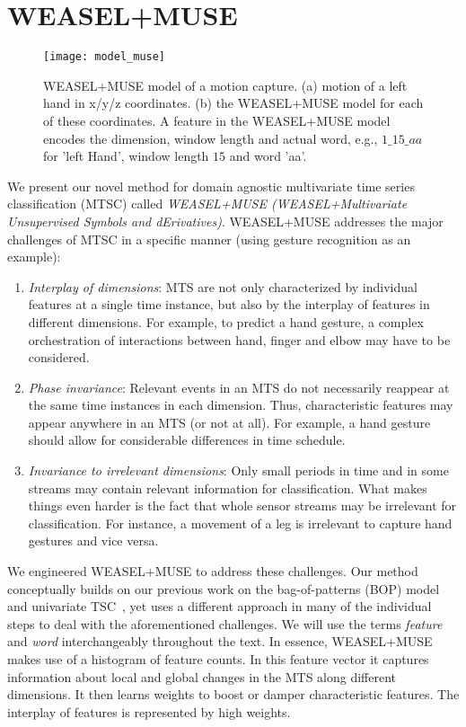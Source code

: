 \documentclass[sigconf]{acmart}
\begin{document}
\section{WEASEL+MUSE}\label{sec:TSCMUSE}

\begin{figure*}
	\texttt{[image: model\_muse]}
	\caption{WEASEL+MUSE model of a motion capture. (a) motion of a left hand in x/y/z coordinates. (b) the WEASEL+MUSE model for each of these coordinates. A feature in the WEASEL+MUSE model encodes the dimension, window length and actual word, e.g., $1\_15\_aa$ for 'left Hand', window length $15$ and word 'aa'.\label{fig:MUSE-Model}}
\end{figure*}

We present our novel method for domain agnostic multivariate time series classification (MTSC) called \emph{WEASEL+MUSE (WEASEL+Multivariate Unsupervised Symbols and dErivatives)}. WEASEL+MUSE addresses the major challenges of MTSC in a specific manner (using gesture recognition as an example):


\begin{enumerate}
	\item \emph{Interplay of dimensions}: MTS are not only characterized by individual features at a single time instance, but also by the interplay of features in different dimensions. For example, to predict a hand gesture, a complex orchestration of interactions between hand, finger and elbow may have to be considered. 
	
	\item \emph{Phase invariance}: Relevant events in an MTS do not necessarily reappear at the same time instances in each dimension. Thus, characteristic features may appear anywhere in an MTS (or not at all). For example, a hand gesture should allow for considerable differences in time schedule.
		
	\item \emph{Invariance to irrelevant dimensions}: Only small periods in time and in some streams may contain relevant information for classification. What makes things even harder is the fact that whole sensor streams may be irrelevant for classification. For instance, a movement of a leg is irrelevant to capture hand gestures and vice versa. 
\end{enumerate}

We engineered WEASEL+MUSE to address these challenges. Our method conceptually builds on our previous work on the bag-of-patterns (BOP) model and univariate TSC~\cite{schafer2014boss,schaefer2017weasel}, yet uses a different approach in many of the individual steps to deal with the aforementioned challenges. We will use the terms \emph{feature} and \emph{word} interchangeably throughout the text. 
In essence, WEASEL+MUSE makes use of a histogram of feature counts. In this feature vector it captures information about local and global changes in the MTS along different dimensions. It then learns weights to boost or damper characteristic features. The interplay of features is represented by high weights.
\end{document}
